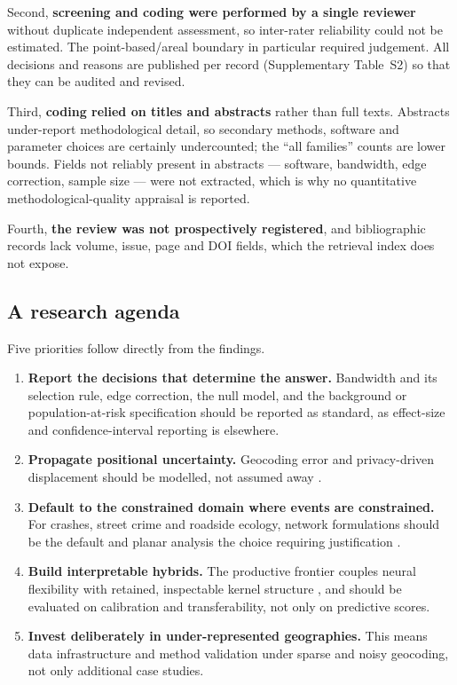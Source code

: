 \documentclass[11pt,a4paper]{article}
\begin{document}
Second, \textbf{screening and coding were performed by a single reviewer}
without duplicate independent assessment, so inter-rater reliability could not
be estimated. The point-based/areal boundary in particular required judgement.
All decisions and reasons are published per record (Supplementary Table~S2) so
that they can be audited and revised.

Third, \textbf{coding relied on titles and abstracts} rather than full texts.
Abstracts under-report methodological detail, so secondary methods, software
and parameter choices are certainly undercounted; the ``all families'' counts
are lower bounds. Fields not reliably present in abstracts --- software,
bandwidth, edge correction, sample size --- were not extracted, which is why
no quantitative methodological-quality appraisal is reported.

Fourth, \textbf{the review was not prospectively registered}, and
bibliographic records lack volume, issue, page and DOI fields, which the
retrieval index does not expose.

\subsection{A research agenda}
Five priorities follow directly from the findings.
\begin{enumerate}\itemsep2pt
  \item \textbf{Report the decisions that determine the answer.} Bandwidth and
        its selection rule, edge correction, the null model, and the
        background or population-at-risk specification should be reported as
        standard, as effect-size and confidence-interval reporting is
        elsewhere.
  \item \textbf{Propagate positional uncertainty.} Geocoding error and
        privacy-driven displacement should be modelled, not assumed away
        \citep{wang2026,brizredon2023}.
  \item \textbf{Default to the constrained domain where events are
        constrained.} For crashes, street crime and roadside ecology, network
        formulations should be the default and planar analysis the choice
        requiring justification \citep{baddeley2020,rakshit2017}.
  \item \textbf{Build interpretable hybrids.} The productive frontier couples
        neural flexibility with retained, inspectable kernel structure
        \citep{cheng2025,mateu2022}, and should be evaluated on calibration
        and transferability, not only on predictive scores.
  \item \textbf{Invest deliberately in under-represented geographies.} This
        means data infrastructure and method validation under sparse and
        noisy geocoding, not only additional case studies.
\end{enumerate}
\end{document}
